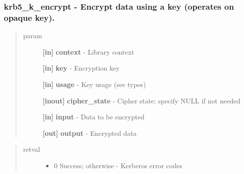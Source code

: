 \documentclass[letterpaper,10pt,english]{sphinxmanual}
\begin{document}
\subsubsection{krb5\_k\_encrypt -  Encrypt data using a key (operates on opaque key).}
\label{appdev/refs/api/krb5_k_encrypt:krb5-k-encrypt-encrypt-data-using-a-key-operates-on-opaque-key}\label{appdev/refs/api/krb5_k_encrypt::doc}

\begin{fulllineitems}
\label{appdev/refs/api/krb5_k_encrypt:c.krb5_k_encrypt}
\end{fulllineitems}

\begin{quote}\begin{description}
\item[{param}] \leavevmode
\textbf{{[}in{]}} \textbf{context} - Library context

\textbf{{[}in{]}} \textbf{key} - Encryption key

\textbf{{[}in{]}} \textbf{usage} - Key usage (see  types)

\textbf{{[}inout{]}} \textbf{cipher\_state} - Cipher state; specify NULL if not needed

\textbf{{[}in{]}} \textbf{input} - Data to be encrypted

\textbf{{[}out{]}} \textbf{output} - Encrypted data

\end{description}\end{quote}
\begin{quote}\begin{description}
\item[{retval}] \leavevmode\begin{itemize}
\item {} 
0   Success; otherwise - Kerberos error codes

\end{itemize}

\end{description}\end{quote}
\end{document}
